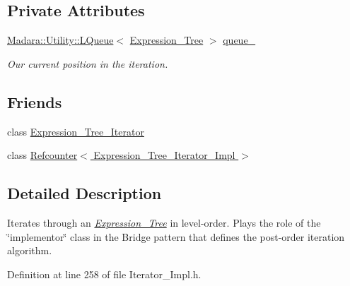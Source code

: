 \subsection*{Private Attributes}
\begin{DoxyCompactItemize}
\item 
\hyperlink{classMadara_1_1Utility_1_1LQueue}{Madara::Utility::LQueue}$<$ \hyperlink{classMadara_1_1Expression__Tree_1_1Expression__Tree}{Expression\_\-Tree} $>$ \hyperlink{classMadara_1_1Expression__Tree_1_1Level__Order__Expression__Tree__Iterator__Impl_aaf63a002cac24c390ad508e53bc5eb1e}{queue\_\-}
\begin{DoxyCompactList}\small\item\em Our current position in the iteration. \item\end{DoxyCompactList}\end{DoxyCompactItemize}
\subsection*{Friends}
\begin{DoxyCompactItemize}
\item 
class \hyperlink{classMadara_1_1Expression__Tree_1_1Level__Order__Expression__Tree__Iterator__Impl_adfe8d209b4dd64ac100d4c9c9adf08c1}{Expression\_\-Tree\_\-Iterator}
\item 
class \hyperlink{classMadara_1_1Expression__Tree_1_1Level__Order__Expression__Tree__Iterator__Impl_aebe1f916414d809cae08793459b42a35}{Refcounter$<$ Expression\_\-Tree\_\-Iterator\_\-Impl $>$}
\end{DoxyCompactItemize}


\subsection{Detailed Description}
Iterates through an {\itshape \hyperlink{classMadara_1_1Expression__Tree_1_1Expression__Tree}{Expression\_\-Tree}\/} in level-\/order. Plays the role of the \char`\"{}implementor\char`\"{} class in the Bridge pattern that defines the post-\/order iteration algorithm. 

Definition at line 258 of file Iterator\_\-Impl.h.



